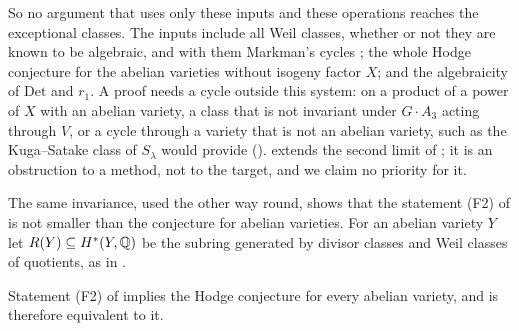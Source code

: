 So no argument that uses only these inputs and these operations reaches the
exceptional classes. The inputs include all Weil classes, whether or not they
are known to be algebraic, and with them Markman's cycles \cite{Mar25a}; the
whole Hodge conjecture for the abelian varieties without isogeny factor $X$;
and the algebraicity of $\mathrm{Det}$ and $r_{1}$. A proof needs a cycle
outside this system: on a product of a power of $X$ with an abelian variety, a
class that is not invariant under $G\cdot A_{3}$ acting through $V$, or a cycle
through a variety that is not an abelian variety, such as the Kuga--Satake
class of $S_{\lambda}$ would provide ().
 extends the second limit of
; it is an obstruction to a method, not to the
target, and we claim no priority for it.

The same invariance, used the other way round, shows that the statement (F2)
of  is not smaller than the conjecture for abelian
varieties. For an abelian variety $Y$ let $R(Y)\subseteq H^{*}(Y,\mathbb{Q})$ be the
subring generated by divisor classes and Weil classes of quotients, as in
.

\begin{proposition}
\label{prop:f2isab}
Statement \textup{(F2)} of  implies the Hodge
conjecture for every abelian variety, and is therefore equivalent to it.
\end{proposition}


